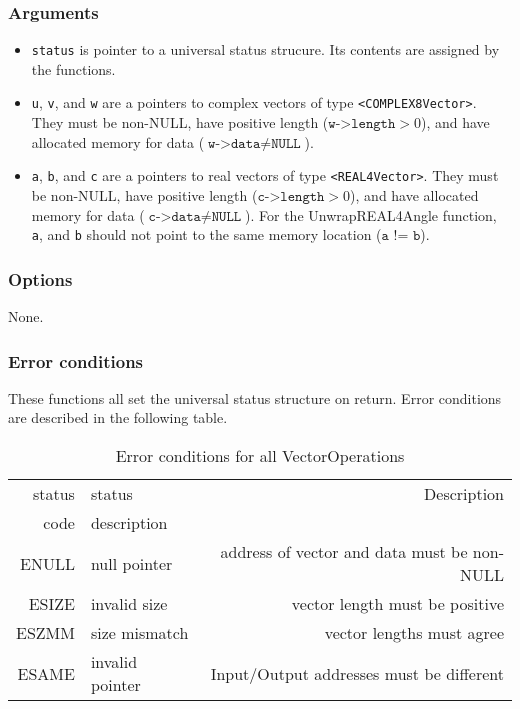 \documentclass{article}
\begin{document}
\subsubsection{Arguments}


\begin{itemize}
\item \texttt{status} is pointer to a universal status strucure. Its contents
are assigned by the functions.
\item \texttt{u}, \texttt{v}, and \texttt{w} are a pointers to complex vectors
of type \texttt{<COMPLEX8Vector>}.  They must be non-NULL, have positive length
($\texttt{w->length}>0$), and have allocated memory for data
($\texttt{w->data}\neq\texttt{NULL}$).
\item \texttt{a}, \texttt{b}, and \texttt{c} are a pointers to real vectors
of type \texttt{<REAL4Vector>}.  They must be non-NULL, have positive length
($\texttt{c->length}>0$), and have allocated memory for data
($\texttt{c->data}\neq\texttt{NULL}$).
For the UnwrapREAL4Angle function, \texttt{a}, and \texttt{b} should  not
point to the same memory location ($\texttt{a != b}$).
\end{itemize}

\subsubsection{Options}

None. 

\subsubsection{Error conditions}


These functions all set the universal status structure on return.
Error conditions are described in the following table.

\begin{table}
\begin{tabular}{|r|l|r|}\hline
status & status        & Description\\
code   & description   & \\\hline
ENULL  & null pointer  & address of vector and data must be non-NULL\\
ESIZE  & invalid size  & vector length must be positive\\
ESZMM  & size mismatch & vector lengths must agree\\
ESAME & invalid pointer & Input/Output addresses must be different\\
\hline
\end{tabular}
\caption{Error conditions for all VectorOperations}\label{tbl:CV}
\end{table}
                                
\end{document}
